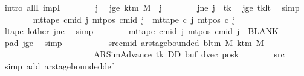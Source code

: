 \begin{isabellebody}
\ {\isacharparenleft}{\kern0pt}intro\ allI\ impI{\isacharparenright}{\kern0pt}\isanewline
\ \ \ \ \ \ \isamarkupfalse%
\ j\ \isamarkupfalse%
\ jge{\isacharcolon}{\kern0pt}\ {\isachardoublequoteopen}k{\isacharunderscore}{\kern0pt}tm\ M\ {\isasymle}\ j{\isachardoublequoteclose}\isanewline
\ \ \ \ \ \ \isamarkupfalse%
\ jne{\isacharcolon}{\kern0pt}\ {\isachardoublequoteopen}j\ {\isasymnoteq}\ tk{\isachardoublequoteclose}\ \isamarkupfalse%
\ jge\ tk{\isacharunderscore}{\kern0pt}lt\ \isamarkupfalse%
\ simp\isanewline
\ \ \ \ \ \ \isamarkupfalse%
\ {\isachardoublequoteopen}mt{\isacharunderscore}{\kern0pt}tape\ cmid\ j\ {\isacharparenleft}{\kern0pt}mt{\isacharunderscore}{\kern0pt}pos\ cmid\ j{\isacharparenright}{\kern0pt}\ {\isacharequal}{\kern0pt}\ mt{\isacharunderscore}{\kern0pt}tape\ c{}\ j\ {\isacharparenleft}{\kern0pt}mt{\isacharunderscore}{\kern0pt}pos\ c{}\ j{\isacharparenright}{\kern0pt}{\isachardoublequoteclose}\isanewline
\ \ \ \ \ \ \ \ \isamarkupfalse%
\ ltape\ lother\ jne\ \isamarkupfalse%
\ simp\isanewline
\ \ \ \ \ \ \isamarkupfalse%
\ {\isachardoublequoteopen}mt{\isacharunderscore}{\kern0pt}tape\ cmid\ j\ {\isacharparenleft}{\kern0pt}mt{\isacharunderscore}{\kern0pt}pos\ cmid\ j{\isacharparenright}{\kern0pt}\ {\isacharequal}{\kern0pt}\ BLANK{}{\isachardoublequoteclose}\ \isamarkupfalse%
\ pad{}\ jge\ \isamarkupfalse%
\ simp\isanewline
\ \ \ \ \isamarkupfalse%
\isanewline
\ \ \ \ \isamarkupfalse%
\ src{\isacharunderscore}{\kern0pt}cmid{\isacharcolon}{\kern0pt}\ {\isachardoublequoteopen}ar{\isacharunderscore}{\kern0pt}stage{\isacharunderscore}{\kern0pt}bounded\ {\isacharparenleft}{\kern0pt}bl{\isacharunderscore}{\kern0pt}tm\ M{\isacharparenright}{\kern0pt}\ {\isacharparenleft}{\kern0pt}k{\isacharunderscore}{\kern0pt}tm\ M{\isacharparenright}{\kern0pt}\isanewline
\ \ \ \ \ \ \ \ \ \ \ \ \ \ \ \ \ \ \ \ \ \ {\isacharparenleft}{\kern0pt}AR{\isacharunderscore}{\kern0pt}SimAdvance{\isacharcomma}{\kern0pt}\ tk{\isacharcomma}{\kern0pt}\ DD{\isacharcomma}{\kern0pt}\ buf{\isacharcomma}{\kern0pt}\ dvec{\isacharcomma}{\kern0pt}\ posk{\isacharparenright}{\kern0pt}{\isachardoublequoteclose}\isanewline
\ \ \ \ \ \ \isamarkupfalse%
\ src{}\ \isamarkupfalse%
\ {\isacharparenleft}{\kern0pt}simp\ add{\isacharcolon}{\kern0pt}\ ar{\isacharunderscore}{\kern0pt}stage{\isacharunderscore}{\kern0pt}bounded{\isacharunderscore}{\kern0pt}def{\isacharparenright}{\kern0pt}\isanewline

\end{isabellebody}
